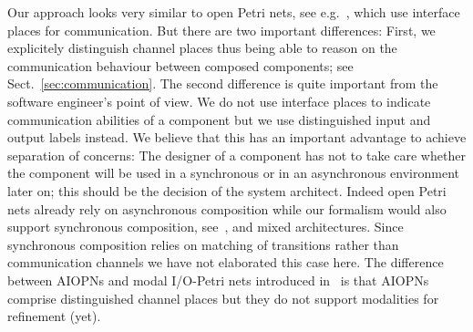Our approach looks very similar to open Petri nets, see e.g.~\cite{Lohmann07}, which use interface places for communication.
But there are two important differences: First, we explicitely distinguish channel places thus being able to reason
on the communication behaviour between composed components; see Sect.~\ref{sec:communication}.
The second difference is quite important from the software engineer's point of view.
We do not use interface places to indicate communication abilities of a component but we use distinguished input and output labels instead.
We believe that this has an important advantage to achieve separation of concerns:
The designer of a component has not to take care whether the component will
be used in a synchronous or in an asynchronous environment later on; this should be the decision of the system architect.
Indeed open Petri nets already rely on asynchronous composition while our formalism would also support synchronous
composition, see~\cite{peterson1981}, and mixed architectures. Since synchronous composition relies on matching of transitions rather than
communication channels we have not elaborated this case here. 
The difference between AIOPNs and modal I/O-Petri nets introduced in~\cite{EHH12} is that AIOPNs comprise distinguished channel places
but they do not support modalities for refinement (yet).

  

